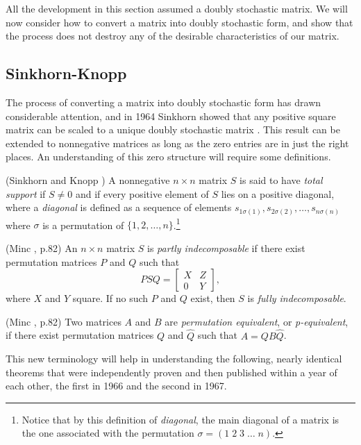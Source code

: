 \documentclass[final]{siamltex}
\begin{document}
All the development in this section assumed a doubly stochastic matrix. We will now consider how to convert a matrix into doubly stochastic form, and show that the process does not destroy any of the desirable characteristics of our matrix.

\subsection{Sinkhorn-Knopp} \label{sec:sk}
The process of converting a matrix into doubly stochastic form has drawn considerable attention, and in 1964 Sinkhorn showed that any positive square matrix can be scaled to a unique doubly stochastic matrix \cite{sinkhorn1964rap}. This result can be extended to nonnegative matrices as long as the zero entries are in just the right places. An understanding of this zero structure will require some definitions.

\begin{definition}
(Sinkhorn and Knopp \cite{sk}) A nonnegative $n \times n$ matrix $S$ is said to have \emph{total support} if $S \ne 0$ and if every  positive element of $S$ lies on a positive diagonal, where a \emph{diagonal} is defined as a sequence of elements $s_{1 \sigma(1)}, s_{2 \sigma(2)}, \dots, s_{n \sigma(n)}$ where $\sigma$ is a permutation of $\{1,2, \dots, n\}$.\footnote{Notice that by this definition of \emph{diagonal}, the main diagonal of a matrix is the one associated with the permutation $\sigma = ( 1 \; 2 \; 3\; \dots \; n)$.} 
\end{definition}

\begin{definition}
(Minc \cite{minc1988nm}, p.82) An $n \times n$ matrix $S$ is \emph{partly indecomposable} if there exist permutation matrices $P$ and $Q$ such that
\[
PSQ = 
\left[
\begin{array}{cc}
 X & Z     \\
 0 &   Y   
\end{array}
\right],
\]
where $X$ and $Y$ square. If no such $P$ and $Q$ exist, then $S$ is \emph{fully indecomposable}. 
\end{definition}

\begin{definition}
(Minc \cite{minc1988nm}, p.82) Two matrices $A$ and $B$ are \emph{permutation equivalent}, or \emph{p-equivalent}, if there exist permutation matrices $Q$ and $\hat{Q}$ such that $A=QB\hat{Q}$.
\end{definition}

This new terminology will help in understanding the following, nearly identical theorems that were independently proven and then published within a year of each other, the first in 1966 and the second in 1967.
\end{document}
